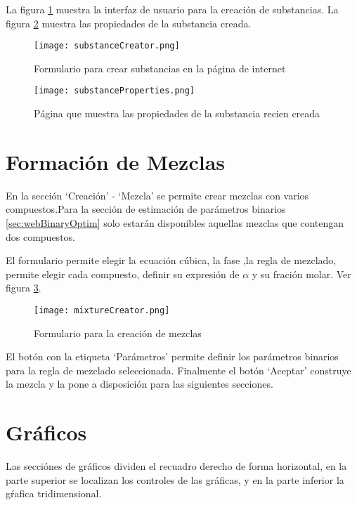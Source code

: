 	La figura \ref{fig:substanceCreator} muestra la interfaz de usuario para la creación de substancias. La figura \ref{fig:substanceProperties} muestra las propiedades de la substancia creada.

	\begin{figure}[H]
		\texttt{[image: substanceCreator.png]}
		\caption{Formulario para crear substancias en la página de internet}
		\label{fig:substanceCreator}
	\end{figure}

	\begin{figure}[H]
		\texttt{[image: substanceProperties.png]}
		\caption{Página que muestra las propiedades de la substancia recien creada}
		\label{fig:substanceProperties}
	\end{figure}

\section{Formación de Mezclas}\label{sec:webMixtureCreator}

	En la sección `Creación' - `Mezcla' se permite crear mezclas con varios compuestos.Para la sección de estimación de parámetros binarios \ref{sec:webBinaryOptim} solo estarán disponibles aquellas mezclas que contengan dos compuestos.

	El formulario permite elegir la ecuación cúbica, la fase ,la regla de mezclado, permite elegir cada compuesto, definir su expresión de $\alpha$ y su fración molar. Ver figura \ref{fig:webMixCreator}.

	\begin{figure}[H]
		\texttt{[image: mixtureCreator.png]}
		\caption{Formulario para la creación de mezclas}
		\label{fig:webMixCreator}
	\end{figure}

	El botón con la etiqueta `Parámetros' permite definir los parámetros binarios para la regla de mezclado seleccionada. Finalmente el botón `Aceptar' construye la mezcla y la pone a disposición para las siguientes secciones.

\section{Gráficos}

	Las secciónes de gráficos dividen el recuadro derecho de forma horizontal, en la parte superior se localizan los controles de las gráficas, y en la parte inferior la gŕafica tridimensional.


